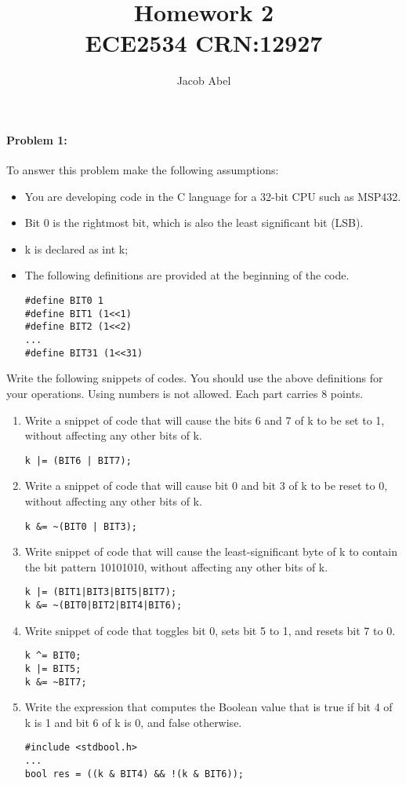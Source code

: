 \documentclass[12pt,letterpaper,titlepage]{article}
\author{Jacob Abel}
\title{	Homework 2
	\\\large ECE2534 CRN:12927
}
\begin{document}
\maketitle

\begin{raggedright}

\paragraph{Problem 1: }
To answer this problem make the following assumptions:
\begin{itemize}
\item You are developing code in the C language for a 32-bit CPU such as MSP432.
\item Bit 0 is the rightmost bit, which is also the least significant bit (LSB).
\item k is declared as int k;
\item The following definitions are provided at the beginning of the code.
\begin{lstlisting}
#define BIT0 1
#define BIT1 (1<<1)
#define BIT2 (1<<2)
...
#define BIT31 (1<<31)
\end{lstlisting}
\end{itemize}
Write the following snippets of codes. You should use the above definitions for your operations. Using numbers is not allowed. Each part carries 8 points.

\begin{enumerate}[label=\Alph*.]
\item Write a snippet of code that will cause the bits 6 and 7 of k to be set to 1, without affecting any other bits of k.
\begin{lstlisting}
k |= (BIT6 | BIT7);
\end{lstlisting}
\item Write a snippet of code that will cause bit 0 and bit 3 of k to be reset to 0, without affecting any other bits of k.
\begin{lstlisting}
k &= ~(BIT0 | BIT3);
\end{lstlisting}
\item Write snippet of code that will cause the least-significant byte of k to contain the bit pattern 10101010, without affecting any other bits of k.
\begin{lstlisting}
k |= (BIT1|BIT3|BIT5|BIT7);
k &= ~(BIT0|BIT2|BIT4|BIT6);
\end{lstlisting}
\item Write snippet of code that toggles bit 0, sets bit 5 to 1, and resets bit 7 to 0.
\begin{lstlisting}
k ^= BIT0;
k |= BIT5;
k &= ~BIT7;
\end{lstlisting}
\item Write the expression that computes the Boolean value that is true if bit 4 of k is 1 and bit 6 of k is 0, and false otherwise.
\begin{lstlisting}
#include <stdbool.h>
...
bool res = ((k & BIT4) && !(k & BIT6));
\end{lstlisting}
\end{enumerate}


\end{raggedright}
\end{document}
